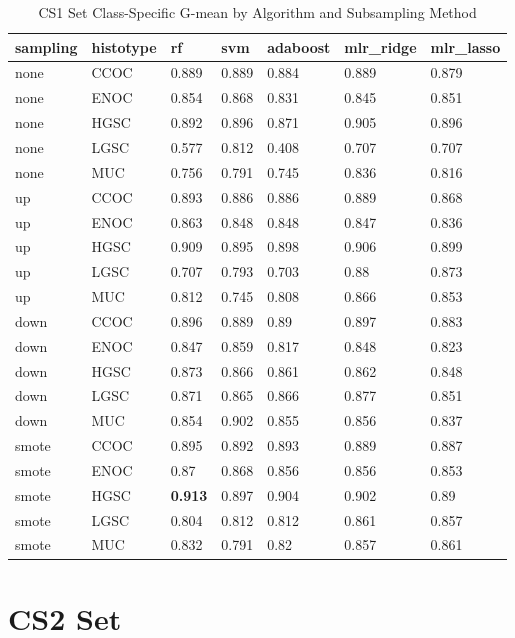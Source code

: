 \documentclass[
]{report}
\begin{document}
\begin{table}

\caption{\label{tab:cs1-gmean-class-table}CS1 Set Class-Specific G-mean by Algorithm and Subsampling Method}
\centering
\begin{tabular}[t]{l|l|l|l|l|l|l}
\hline
sampling & histotype & rf & svm & adaboost & mlr\_ridge & mlr\_lasso\\
\hline
none & CCOC & 0.889 & 0.889 & 0.884 & 0.889 & 0.879\\
\hline
none & ENOC & 0.854 & 0.868 & 0.831 & 0.845 & 0.851\\
\hline
none & HGSC & 0.892 & 0.896 & 0.871 & 0.905 & 0.896\\
\hline
none & LGSC & 0.577 & 0.812 & 0.408 & 0.707 & 0.707\\
\hline
none & MUC & 0.756 & 0.791 & 0.745 & 0.836 & 0.816\\
\hline
up & CCOC & 0.893 & 0.886 & 0.886 & 0.889 & 0.868\\
\hline
up & ENOC & 0.863 & 0.848 & 0.848 & 0.847 & 0.836\\
\hline
up & HGSC & 0.909 & 0.895 & 0.898 & 0.906 & 0.899\\
\hline
up & LGSC & 0.707 & 0.793 & 0.703 & 0.88 & 0.873\\
\hline
up & MUC & 0.812 & 0.745 & 0.808 & 0.866 & 0.853\\
\hline
down & CCOC & 0.896 & 0.889 & 0.89 & 0.897 & 0.883\\
\hline
down & ENOC & 0.847 & 0.859 & 0.817 & 0.848 & 0.823\\
\hline
down & HGSC & 0.873 & 0.866 & 0.861 & 0.862 & 0.848\\
\hline
down & LGSC & 0.871 & 0.865 & 0.866 & 0.877 & 0.851\\
\hline
down & MUC & 0.854 & 0.902 & 0.855 & 0.856 & 0.837\\
\hline
smote & CCOC & 0.895 & 0.892 & 0.893 & 0.889 & 0.887\\
\hline
smote & ENOC & 0.87 & 0.868 & 0.856 & 0.856 & 0.853\\
\hline
smote & HGSC & \textbf{0.913} & 0.897 & 0.904 & 0.902 & 0.89\\
\hline
smote & LGSC & 0.804 & 0.812 & 0.812 & 0.861 & 0.857\\
\hline
smote & MUC & 0.832 & 0.791 & 0.82 & 0.857 & 0.861\\
\hline
\end{tabular}
\end{table}

\hypertarget{cs2-set}{%
\section{CS2 Set}\label{cs2-set}}
\end{document}

